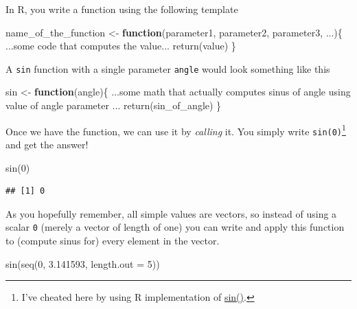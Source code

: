 \documentclass[
]{book}
\newenvironment{Shaded}{\begin{snugshade}}{\end{snugshade}}
\newcommand{\AttributeTok}[1]{\textcolor[rgb]{0.77,0.63,0.00}{#1}}
\newcommand{\ControlFlowTok}[1]{\textcolor[rgb]{0.13,0.29,0.53}{\textbf{#1}}}
\newcommand{\DecValTok}[1]{\textcolor[rgb]{0.00,0.00,0.81}{#1}}
\newcommand{\FloatTok}[1]{\textcolor[rgb]{0.00,0.00,0.81}{#1}}
\newcommand{\FunctionTok}[1]{\textcolor[rgb]{0.00,0.00,0.00}{#1}}
\newcommand{\NormalTok}[1]{#1}
\newcommand{\OtherTok}[1]{\textcolor[rgb]{0.56,0.35,0.01}{#1}}
\begin{document}
In R, you write a function using the following template

\begin{Shaded}
\begin{Highlighting}[]
\NormalTok{name\_of\_the\_function }\OtherTok{\textless{}{-}} \ControlFlowTok{function}\NormalTok{(parameter1, parameter2, parameter3, ...)\{}
\NormalTok{  ...some code that computes the value...}
  \FunctionTok{return}\NormalTok{(value)}
\NormalTok{\}}
\end{Highlighting}
\end{Shaded}

A \texttt{sin} function with a single parameter \texttt{angle} would look something like this

\begin{Shaded}
\begin{Highlighting}[]
\NormalTok{sin }\OtherTok{\textless{}{-}} \ControlFlowTok{function}\NormalTok{(angle)\{}
\NormalTok{  ...some math that actually computes sinus of angle using value of angle parameter ...}
  \FunctionTok{return}\NormalTok{(sin\_of\_angle)}
\NormalTok{\}}
\end{Highlighting}
\end{Shaded}

Once we have the function, we can use it by \emph{calling} it. You simply write \texttt{sin(0)}\footnote{I've cheated here by using R implementation of \href{https://stat.ethz.ch/R-manual/R-devel/library/base/html/Trig.html}{sin()}.} and get the answer!

\begin{Shaded}
\begin{Highlighting}[]
\FunctionTok{sin}\NormalTok{(}\DecValTok{0}\NormalTok{)}
\end{Highlighting}
\end{Shaded}

\begin{verbatim}
## [1] 0
\end{verbatim}

As you hopefully remember, all simple values are vectors, so instead of using a scalar \texttt{0} (merely a vector of length of one) you can write and apply this function to (compute sinus for) every element in the vector.

\begin{Shaded}
\begin{Highlighting}[]
\FunctionTok{sin}\NormalTok{(}\FunctionTok{seq}\NormalTok{(}\DecValTok{0}\NormalTok{, }\FloatTok{3.141593}\NormalTok{, }\AttributeTok{length.out =} \DecValTok{5}\NormalTok{))}
\end{Highlighting}
\end{Shaded}
\end{document}
